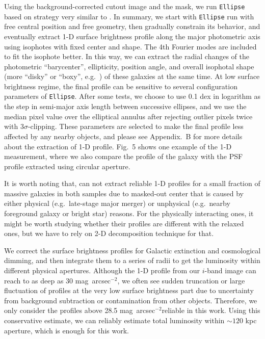 \documentclass[preprint]{aastex}
\def\sb{mag~arcsec$^{-2}$}
\begin{document}
\begin{CJK*}{UTF8}{gbsn}
    Using the background-corrected cutout image and the mask, we run \texttt{Ellipse} 
    based on strategy very similar to \citep{Li2012}.  
    In summary, we start with \texttt{Ellipse} run with free central position and free
    geometry, then gradually constrain its behavior, and eventually extract 1-D 
    surface brightness profile along the major photometric axis using isophotes with 
    fixed center and shape.
    The 4th Fourier modes are included to fit the isophote better. 
    In this way, we can extract the radial changes of the photometric ``barycenter'', 
    ellipticity, position angle, and overall isophotal shape (more ``disky'' or 
    ``boxy'', e.g.\ \citealt{Kormendy2009}) of these galaxies at the same time.  
    At low surface brightness regime, the final profile can be sensitive to several 
    configuration parameters of \texttt{Ellipse}.  
    After some tests, we choose to use 0.1 dex in logarithm as the step in semi-major 
    axis length between successive ellipses, and we use the median pixel value over the
    elliptical annulus after rejecting outlier pixels twice with $3\sigma$-clipping.
    These parameters are selected to make the final profile less affected by any nearby
    objects, and please see Appendix.~B for more details about the extraction of 
    1-D profile. 
    Fig.~5 shows one example of the 1-D measurement, where we also compare the profile 
    of the galaxy with the PSF profile extracted using circular aperture.  
    
    It is worth noting that, can not extract reliable 1-D profiles for a small fraction 
    of massive galaxies in both samples due to masked-out center that is caused by 
    either physical (e.g.\ late-stage major merger) or unphysical (e.g.\ nearby foreground 
    galaxy or bright star) reasons.  
    For the physically interacting ones, it might be worth studying whether their 
    profiles are different with the relaxed ones, but we have to rely on 2-D 
    decomposition technique for that.  
    
    We correct the surface brightness profiles for Galactic extinction and 
    cosmological dimming, and then integrate them to a series of radii to get the 
    luminosity within different physical apertures.  
    Although the 1-D profile from our $i$-band image can reach to as deep as 
    30 \sb, we often see sudden truncation or large fluctuation of profiles 
    at the very low surface brightness part due to uncertainty from background 
    subtraction or contamination from other objects.  
    Therefore, we only consider the profiles above 28.5 \sb reliable in this 
    work.  
    Using this conservative estimate, we can reliably estimate total luminosity 
    within $\sim 120$ kpc aperture, which is enough for this work.  
    

\end{CJK*}
\end{document}

